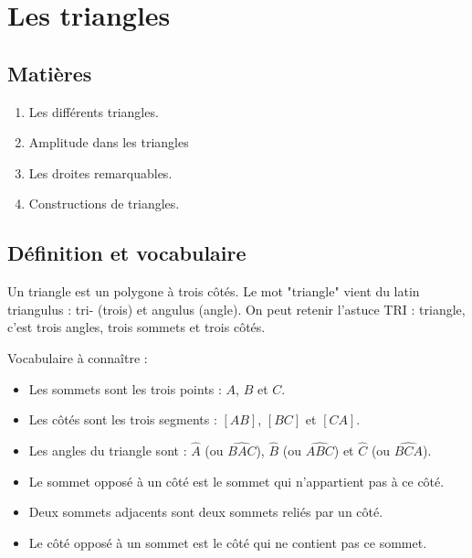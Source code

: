\documentclass[../../syllabus_1.tex]{subfiles}
\begin{document}
\raggedbottom
\chapter{Les triangles}

\section*{Matières}
\begin{enumerate}[cols=2, label=\textbf{\arabic*.}]
    \item Les différents triangles.
    \item Amplitude dans les triangles
    \item Les droites remarquables.
    \item Constructions de triangles.
\end{enumerate}

\section{Définition et vocabulaire}

Un triangle est un polygone à trois côtés. Le mot "triangle" vient du latin triangulus : tri- (trois) et angulus (angle). On peut retenir l'astuce TRI : triangle, c'est trois angles, trois sommets et trois côtés.

\begin{center}
\end{center}

Vocabulaire à connaître :
\begin{itemize}[itemsep=1em]
    \item Les sommets sont les trois points : $A$, $B$ et $C$.
    \item Les côtés sont les trois segments : $[AB]$, $[BC]$ et $[CA]$.
    \item Les angles du triangle sont : $\widehat{A}$ (ou $\widehat{BAC}$), $\widehat{B}$ (ou $\widehat{ABC}$) et $\widehat{C}$ (ou $\widehat{BCA}$).
    \item Le sommet opposé à un côté est le sommet qui n'appartient pas à ce côté.
    \item Deux sommets adjacents sont deux sommets reliés par un côté.
    \item Le côté opposé à un sommet est le côté qui ne contient pas ce sommet.
\end{itemize}
\end{document}
